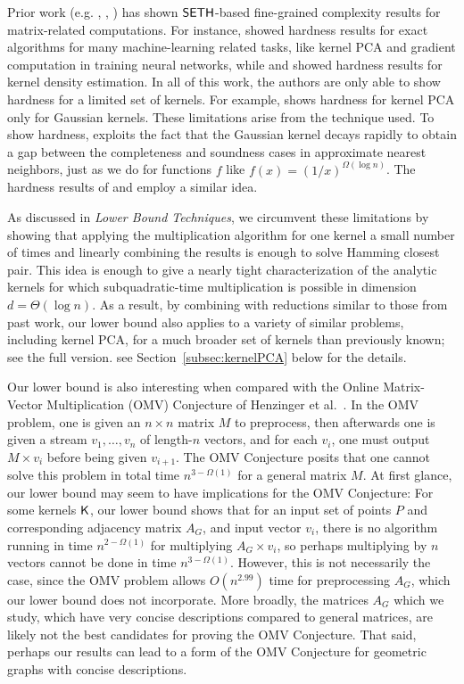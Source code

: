 Prior work (e.g. \cite{cs17}, \cite{bis17}, \cite{bcis18}) has shown $\mathsf{SETH}$-based fine-grained complexity results for matrix-related computations. For instance, \cite{bis17} showed hardness results for exact algorithms for many machine-learning related tasks, like kernel PCA and gradient computation in training neural networks, while \cite{cs17} and \cite{bcis18} showed hardness results for kernel density estimation. In all of this work, the authors are only able to show hardness for a limited set of kernels. For example, \cite{bis17} shows hardness for kernel PCA only for Gaussian kernels. These limitations arise from the technique used. To show hardness, \cite{bis17} exploits the fact that the Gaussian kernel decays rapidly to obtain a gap between the completeness and soundness cases in approximate nearest neighbors, just as we do for functions $f$ like $f(x) = (1/x)^{\Omega(\log n)}$. The hardness results of \cite{cs17} and \cite{bcis18} employ a similar idea.

As discussed in \emph{Lower Bound Techniques}, we circumvent these limitations by showing that applying the multiplication algorithm for one kernel a small number of times and linearly combining the results is enough to solve Hamming closest pair. This idea is enough to give a nearly tight characterization of the analytic kernels for which subquadratic-time multiplication is possible in dimension $d = \Theta(\log n)$. As a result, by combining with reductions similar to those from past work, our lower bound also applies to a variety of similar problems, including kernel PCA, for a much broader set of kernels than previously known; 
\ifdefined\isfocs
see the full version.
\else
see Section~\ref{subsec:kernelPCA} below for the details.
\fi

Our lower bound is also interesting when compared with the Online Matrix-Vector Multiplication (OMV) Conjecture of Henzinger et al.~\cite{henzinger2015unifying}. In the OMV problem, one is given an $n \times n$ matrix $M$ to preprocess, then afterwards one is given a stream $v_1, \ldots, v_n$ of length-$n$ vectors, and for each $v_i$, one must output $M \times v_i$ before being given $v_{i+1}$. The OMV Conjecture posits that one cannot solve this problem in total time $n^{3-\Omega(1)}$ for a general matrix $M$. 
At first glance, our lower bound may seem to have implications for the OMV Conjecture: For some kernels $\mathsf{K}$, our lower bound shows that for an input set of points $P$ and corresponding adjacency matrix $A_G$, and input vector $v_i$, there is no algorithm running in time $n^{2-\Omega(1)}$ for multiplying $A_G \times v_i$, so perhaps multiplying by $n$ vectors cannot be done in time $n^{3-\Omega(1)}$. However, this is not necessarily the case, since the OMV problem allows $O(n^{2.99})$ time for preprocessing $A_G$, which our lower bound does not incorporate. More broadly, the matrices $A_G$ which we study, which have very concise descriptions compared to general matrices, are likely not the best candidates for proving the OMV Conjecture. That said, perhaps our results can lead to a form of the OMV Conjecture for geometric graphs with concise descriptions.

